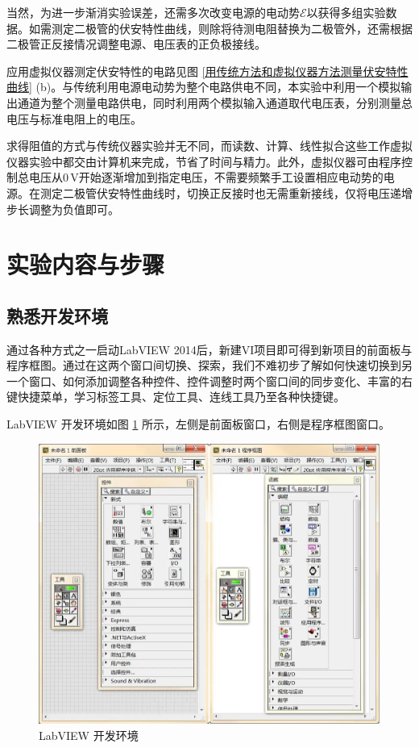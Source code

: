 \documentclass[UTF8]{article}
\theoremstyle{MyLineTheoremStyle} %
\theoremstyle{MyBlockTheoremStyle} %
\theoremstyle{MySubsubsectionStyle} %
\begin{document}
当然，为进一步渐消实验误差，还需多次改变电源的电动势$ \mathscr E $以获得多组实验数据。如需测定二极管的伏安特性曲线，则除将待测电阻替换为二极管外，还需根据二极管正反接情况调整电源、电压表的正负极接线。

应用虚拟仪器测定伏安特性的电路见图 \ref{用传统方法和虚拟仪器方法测量伏安特性曲线} (b)。与传统利用电源电动势为整个电路供电不同，本实验中利用一个模拟输出通道为整个测量电路供电，同时利用两个模拟输入通道取代电压表，分别测量总电压与标准电阻上的电压。

求得阻值的方式与传统仪器实验并无不同，而读数、计算、线性拟合这些工作虚拟仪器实验中都交由计算机来完成，节省了时间与精力。此外，虚拟仪器可由程序控制总电压从$ 0\,\mathrm V $开始逐渐增加到指定电压，不需要频繁手工设置相应电动势的电源。在测定二极管伏安特性曲线时，切换正反接时也无需重新接线，仅将电压递增步长调整为负值即可。


\section{实验内容与步骤}
\subsection{熟悉开发环境}
通过各种方式之一启动LabVIEW 2014后，新建VI项目即可得到新项目的前面板与程序框图。通过在这两个窗口间切换、探索，我们不难初步了解如何快速切换到另一个窗口、如何添加调整各种控件、控件调整时两个窗口间的同步变化、丰富的右键快捷菜单，学习标签工具、定位工具、连线工具乃至各种快捷键。

LabVIEW 开发环境如图 \ref{LabVIEW 开发环境} 所示，左侧是前面板窗口，右侧是程序框图窗口。

\begin{figure}[H]\centering
\includegraphics[width=0.75\columnwidth]{assets/LabVIEW开发环境.png}
\caption{LabVIEW 开发环境}\label{LabVIEW 开发环境}
\end{figure}
\end{document}
